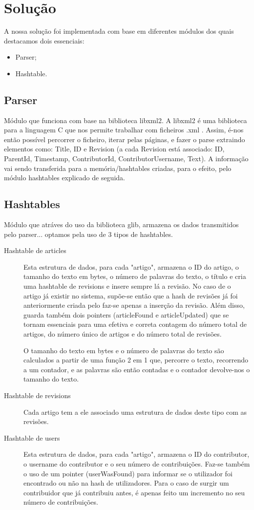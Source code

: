 \documentclass[a4paper]{article}
\begin{document}
\section{Solução}
A nossa solução foi implementada com base em diferentes módulos dos quais destacamos dois essenciais:

\begin{itemize}
    \item Parser;
    \item Hashtable.
\end{itemize}
\label{sec:solucao}

\subsection{Parser}
Módulo que funciona com base na biblioteca libxml2. A libxml2 é uma biblioteca para a linguagem C que nos permite trabalhar com ficheiros .xml .
Assim, é-nos então possível percorrer o ficheiro, iterar pelas páginas, e fazer o parse extraindo elementos como: Title, ID e Revision (a cada Revision está associado: ID, ParentId, Timestamp, ContributorId, ContributorUsername, Text).
A informação vai sendo transferida para a memória/hashtables criadas, para o efeito, pelo módulo hashtables explicado de seguida.

\subsection{Hashtables}
Módulo que atráves do uso da biblioteca glib, armazena os dados transmitidos pelo parser... optamos pela uso de 3 tipos de hashtables.
\begin{description}
    \item[Hashtable de articles] Esta estrutura de dados, para cada "artigo", armazena o ID do artigo, o tamanho do texto em bytes, o número de palavras do texto, o título e cria uma hashtable de revisions e insere sempre lá a revisão. No caso de o artigo já existir no sistema, supõe-se então que a hash de revisões já foi anteriormente criada pelo faz-se apenas a inserção da revisão. Além disso, guarda também dois pointers (articleFound e articleUpdated) que se tornam essenciais para uma efetiva e correta contagem do número total de artigos, do número único de artigos e do número total de revisões.
    
    O tamanho do texto em bytes e o número de palavras do texto são calculados a partir de uma função 2 em 1 que, percorre o texto, recorrendo a um contador, e as palavras são então contadas e o contador devolve-nos o tamanho do texto.
	\item[Hashtable de revisions] Cada artigo tem a ele associado uma estrutura de dados deste tipo com as revisões.
	\item[Hashtable de users] Esta estrutura de dados, para cada "artigo", armazena o ID do contributor, o username do contributor e o seu número de contribuições. Faz-se também o uso de um pointer (userWasFound) para informar se o utilizador foi encontrado ou não na hash de utilizadores. Para o caso de surgir um contribuidor que já contribuiu antes, é apenas feito um incremento no seu número de contribuições.

\end{description}
\end{document}
